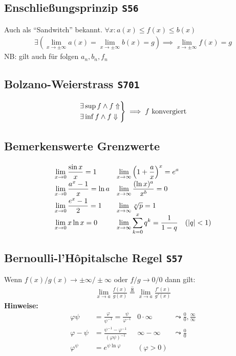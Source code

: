 \documentclass[a4paper, twocolumn]{article}
\newcommand{\heq}{\ensuremath{\stackrel{\hat{\texttt{H}}}{=}}}
\newcommand{\brpage}[1]{\textcolor{red!70!black}{\small\texttt{S#1}}}
\begin{document}
{\subsection{Enschlie{\ss}ungsprinzip \brpage{56}}
Auch als ``Sandwitch'' bekannt.
\(\forall x : a(x) \leq f(x) \leq b(x)\)
\begin{align*}
  \exists \left(\lim_{x\to\pm\infty} a(x) = \lim_{x\to\pm\infty} b(x) = g\right)
  \implies
  \lim_{x\to\pm\infty} f(x) = g
\end{align*}
\footnotesize{NB: gilt auch f\"ur folgen \(a_n, b_n, f_n\)}

\subsection{Bolzano-Weierstrass \brpage{701}}
\begin{align*}
  \begin{rcases}
    \exists \sup f \wedge f\Uparrow \\
    \exists \inf f \wedge f\Downarrow
  \end{rcases}
  \implies f \text{ konvergiert}
\end{align*}

\subsection{Bemerkenswerte Grenzwerte}
\begin{align*}
  \setlength\extrarowheight{8pt}
  \begin{array}{*2{>{\displaystyle}l}}
    \lim_{x\to 0} \frac{\sin x}{x} = 1 & \lim_{x\to\infty} \left(1 + \frac{a}{x}\right)^x = e^a \\
    \lim_{x\to 0} \frac{a^x - 1}{x} = \ln a & \lim_{x\to\infty} \frac{(\ln x)^a}{x^b} = 0 \\
    \lim_{x\to 0} \frac{e^x - 1}{2} = 1 & \lim_{x\to\infty} \sqrt[x]{p} = 1\\
    \lim_{x\to 0} x\ln x = 0 & \lim_{x\to\infty} \sum_{k=0}^x q^k = \frac{1}{1-q} \quad (|q| < 1)\\
  \end{array}
\end{align*}

\subsection{Bernoulli-l'H\^opitalsche Regel \brpage{57}}
Wenn \(f(x)/g(x) \to \pm\infty/\pm\infty\) oder \(f/g \to 0/0\) dann gilt:
\begin{align*}
  \lim_{x\to a} \frac{f(x)}{g(x)} \heq \lim_{x\to a} \frac{f'(x)}{g'(x)}
\end{align*}
\textbf{Hinweise:}
\begin{align*}
  \varphi\psi &= \frac{\varphi}{\psi^{-1}} = \frac{\psi}{\varphi^{-1}}
  & 0\cdot\infty &\leadsto \frac{0}{0}, \frac{\infty}{\infty} \\
  \varphi - \psi &= \frac{\psi^{-1} - \varphi^{-1}}{(\varphi\psi)^{-1}}
  & \infty - \infty &\leadsto \frac{0}{0} \\
  \varphi^\psi &= e^{\psi\ln\varphi} & (\varphi > 0)
\end{align*}

}
\end{document}
